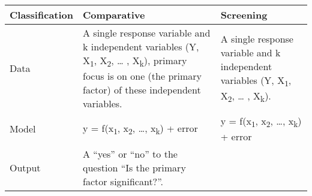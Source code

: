 \documentclass[]{book}
\theoremstyle{definition}
\theoremstyle{definition}
\theoremstyle{definition}
\theoremstyle{remark}
\begin{document}
\begin{longtable}[]{@{}lll@{}}
\toprule
\begin{minipage}[b]{0.14\columnwidth}\raggedright\strut
Classification\strut
\end{minipage} & \begin{minipage}[b]{0.39\columnwidth}\raggedright\strut
Comparative\strut
\end{minipage} & \begin{minipage}[b]{0.39\columnwidth}\raggedright\strut
Screening\strut
\end{minipage}\tabularnewline
\midrule
\endhead
\begin{minipage}[t]{0.14\columnwidth}\raggedright\strut
Data\strut
\end{minipage} & \begin{minipage}[t]{0.39\columnwidth}\raggedright\strut
A single response variable and k independent variables (Y,
X\textsubscript{1}, X\textsubscript{2}, \ldots{} , X\textsubscript{k}),
primary focus is on one (the primary factor) of these independent
variables.\strut
\end{minipage} & \begin{minipage}[t]{0.39\columnwidth}\raggedright\strut
A single response variable and k independent variables (Y,
X\textsubscript{1}, X\textsubscript{2}, \ldots{} ,
X\textsubscript{k}).\strut
\end{minipage}\tabularnewline
\begin{minipage}[t]{0.14\columnwidth}\raggedright\strut
Model\strut
\end{minipage} & \begin{minipage}[t]{0.39\columnwidth}\raggedright\strut
y = f(x\textsubscript{1}, x\textsubscript{2}, \ldots{},
x\textsubscript{k}) + error\strut
\end{minipage} & \begin{minipage}[t]{0.39\columnwidth}\raggedright\strut
y = f(x\textsubscript{1}, x\textsubscript{2}, \ldots{},
x\textsubscript{k}) + error\strut
\end{minipage}\tabularnewline
\begin{minipage}[t]{0.14\columnwidth}\raggedright\strut
Output\strut
\end{minipage} & \begin{minipage}[t]{0.39\columnwidth}\raggedright\strut
A ``yes'' or ``no'' to the question ``Is the primary factor
significant?''.\strut
\end{minipage} & \begin{minipage}[t]{0.39\columnwidth}\raggedright\strut

\end{minipage}
\end{longtable}
\end{document}
